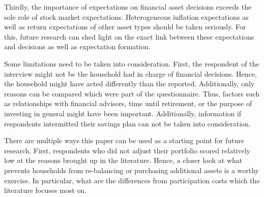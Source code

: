 \documentclass[ProjectABM]{subfiles}
\begin{document}
Thirdly, the importance of expectations on financial asset decisions exceeds the sole role of stock market expectations. Heterogeneous inflation expectations as well as return expectations of other asset types should be taken seriously. For this, future research can shed light on the exact link between these expectations and decisions as well as expectation formation.


Some limitations need to be taken into consideration. First, the respondent of the interview might not be the household had in charge of financial decisions. Hence, the household might have acted differently than the reported. Additionally, only reasons can be compared which were part of the questionnaire. Thus, factors such as relationships with financial advisors, time until retirement, or the purpose of investing in general might have been important. Additionally, information if respondents intermitted their savings plan can not be taken into consideration.


There are multiple ways this paper can be used as a starting point for future research. First, respondents who did not adjust their portfolio scored relatively low at the reasons brought up in the literature. Hence, a closer look at what prevents households from re-balancing or purchasing additional assets is a worthy exercise. In particular, what are the differences from participation costs which the literature focuses most on.
\end{document}
